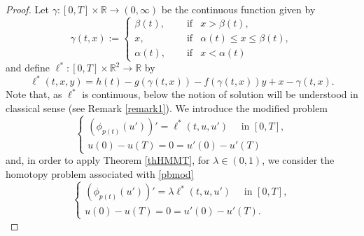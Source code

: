 \documentclass[10pt,a4paper]{amsart}
\begin{document}
\begin{proof} Let $\gamma:[0,T]\times\mathbb{R}\to(0,\infty)$ be the continuous function given by
$$\gamma(t,x):=\left \{
            \begin{array}{lll}
		      \beta(t),\quad &\mbox{ if}& x>\beta(t),\\
		      x,\quad\ &\mbox{ if}& \alpha(t)\leq x\leq\beta(t),\\
              \alpha(t),\quad &\mbox{ if}& x<\alpha(t)
			\end{array}
\right.$$
and define $\ell^{*}:[0,T]\times\mathbb{R}^2\to\mathbb{R}$ by $$\ell^*(t,x,y)=h(t)-g(\gamma(t,x))-f(\gamma(t,x))y+x-\gamma(t,x).$$ Note that, as $\ell^{*}$ is continuous, below the notion of solution will be understood in classical sense (see Remark \ref{remark1}).  We introduce the modified problem
\begin{equation}\label{pbmod}
	\left \{
            \begin{array}{ll}
		      (\phi_{p(t)}(u'))'=\ell^*(t,u,u')\quad \mbox{ in }[0,T],\\
		      u(0)-u(T)=0=u'(0)-u'(T)
			\end{array}
\right.
\end{equation}
and, in order to apply Theorem \ref{thHMMT}, for $\lambda\in(0,1)$, we consider the homotopy problem associated with \eqref{pbmod}
\begin{equation}\label{pbmodlambda}
	\left \{
            \begin{array}{ll}
		      (\phi_{p(t)}(u'))'=\lambda\ell^*(t,u,u')\quad \mbox{ in }[0,T],\\
		      u(0)-u(T)=0=u'(0)-u'(T).
			\end{array}
\right.
\end{equation}


\end{proof}
\end{document}
